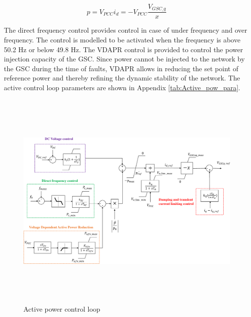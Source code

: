 \begin{equation}\label{P_eq}
    p = V_{PCC}i_d = -V_{PCC}\frac{V_{GSC\_q}}{x}
\end{equation}

The direct frequency control provides control in case of under frequency and over frequency. The control is modelled to be activated when the frequency is above 50.2 Hz or below 49.8 Hz.
The \gls{VDAPR} control is provided to control the power injection capacity of the \gls{GSC}. Since power cannot be injected to the network by the \gls{GSC} during the time of faults, \gls{VDAPR} allows in reducing the set point of reference power and thereby refining the dynamic stability of the network. The active control loop parameters are shown in Appendix \ref{tab:Active_pow_para}.

\begin{figure}[H]
\centering
    \includegraphics[height = 11cm,width = \textwidth]{Diagrams/Chapter_3/Active_power_loop.pdf}
    \caption{Active power control loop \cite{korai_dynamic_2019}}
    \label{fig:Active_Power_Control_Loop}
\end{figure}

